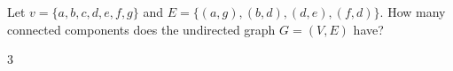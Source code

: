 \begin{prob}
    Let $v = \{a, b, c, d, e, f, g\}$ and $E = \{(a,g), (b,d), (d, e), (f, d)\}$.
    How many connected components does the undirected graph $G =(V, E)$ have?

    \begin{soln}
        3
    \end{soln}

\end{prob}
